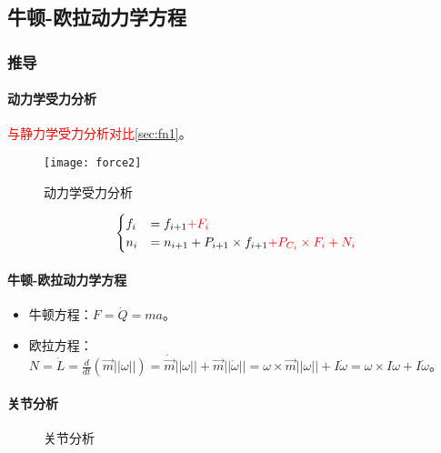 \documentclass[
12pt, %
a4paper, 
oneside, %
headinclude,footinclude, %
]{scrartcl}
\begin{document}
\subsection[牛顿-欧拉动力学方程]{牛顿-欧拉动力学方程}
\subsubsection[推导]{推导}
\paragraph{动力学受力分析}\label{sec:fn2}
\textcolor{red}{与静力学受力分析对比}\ref{sec:fn1}。 \\
\begin{minipage}{0.3\textwidth}
\begin{figure}[H]
\centering 
\texttt{[image: force2]} 
\caption{动力学受力分析}
\end{figure}
\end{minipage}
\begin{minipage}{0.7\textwidth}
$$
\begin{cases}
f_i &= f_{i + 1} \textcolor{red}{+ F_i} \\
n_i &= n_{i + 1} + P_{i + 1} \times f_{i + 1} \textcolor{red}{+ P_{C_i} \times F_i + N_i} \\
\end{cases}
$$
\end{minipage}
\paragraph{牛顿-欧拉动力学方程}
\begin{itemize}
\item 牛顿方程：$ F = \dot{Q} = ma $。
\item 欧拉方程：$ N = \dot{L} = \frac{d}{dt}(\vec{m}||\omega||) = \dot{\vec{m}}||\omega|| + \vec{m}||\dot{\omega}|| = \omega \times \vec{m}||\omega|| + I \dot{\omega} = \omega \times I \omega + I \dot{\omega} $。
\end{itemize}
\paragraph{关节分析}
\begin{figure}[H]
\centering
{} \quad
{}
\caption{关节分析}
\end{figure}
\end{document}
